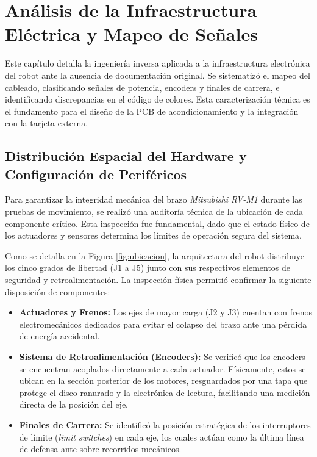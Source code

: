 \chapter{Análisis de la Infraestructura Eléctrica y Mapeo de Señales}
\lineaLateral

\begin{resumenCapitulo}
	Este capítulo detalla la ingeniería inversa aplicada a la infraestructura electrónica del robot ante la ausencia de documentación original. Se sistematizó el mapeo del cableado, clasificando señales de potencia, encoders y finales de carrera, e identificando discrepancias en el código de colores. Esta caracterización técnica es el fundamento para el diseño de la PCB de acondicionamiento y la integración con la tarjeta externa.
\end{resumenCapitulo}


\section{Distribución Espacial del Hardware y Configuración de Periféricos}

Para garantizar la integridad mecánica del brazo \textit{Mitsubishi RV-M1} durante las pruebas de movimiento, se realizó una auditoría técnica de la ubicación de cada componente crítico. Esta inspección fue fundamental, dado que el estado físico de los actuadores y sensores determina los límites de operación segura del sistema.

Como se detalla en la Figura \ref{fig:ubicacion}, la arquitectura del robot distribuye los cinco grados de libertad (J1 a J5) junto con sus respectivos elementos de seguridad y retroalimentación. La inspección física permitió confirmar la siguiente disposición de componentes:

\begin{itemize}
	\item \textbf{Actuadores y Frenos:} Los ejes de mayor carga (J2 y J3) cuentan con frenos electromecánicos dedicados para evitar el colapso del brazo ante una pérdida de energía accidental.
	\item \textbf{Sistema de Retroalimentación (Encoders):} Se verificó que los encoders se encuentran acoplados directamente a cada actuador. Físicamente, estos se ubican en la sección posterior de los motores, resguardados por una tapa que protege el disco ranurado y la electrónica de lectura, facilitando una medición directa de la posición del eje.
	\item \textbf{Finales de Carrera:} Se identificó la posición estratégica de los interruptores de límite (\textit{limit switches}) en cada eje, los cuales actúan como la última línea de defensa ante sobre-recorridos mecánicos.
\end{itemize}



